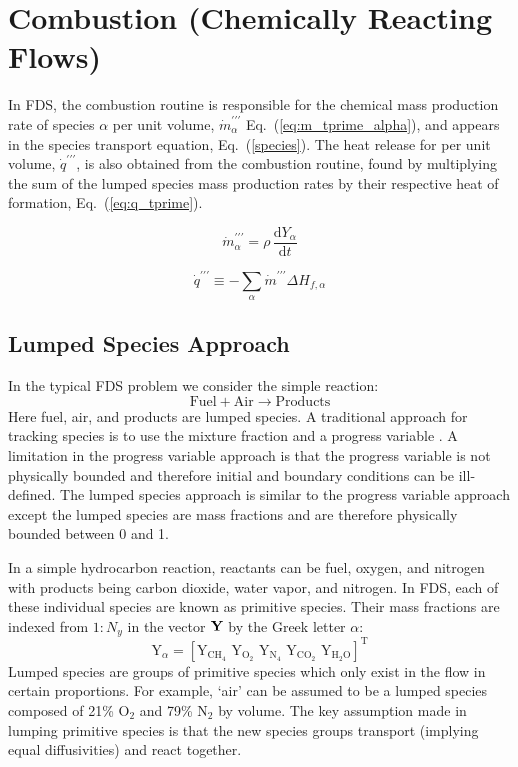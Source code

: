 \chapter{Combustion (Chemically Reacting Flows)}

\label{combustionsection}
In FDS, the combustion routine is responsible for the chemical mass production rate of species $\alpha$ per unit volume, $\dot{m}^{\prime\prime\prime}_{\alpha}$ Eq.~(\ref{eq:m_tprime_alpha}), and appears in the species transport equation, Eq.~(\ref{species}). The heat release for per unit volume, $\dot{q}^{\prime\prime\prime}$, is also obtained from the combustion routine, found by multiplying the sum of the lumped species mass production rates by their respective heat of formation, Eq.~(\ref{eq:q_tprime}).

\begin{equation}\label{eq:m_tprime_alpha}
\dot{m}^{\prime\prime\prime}_{\alpha}=\rho \,\frac{\mbox{d}Y_{\alpha}}{\mbox{d}t}
\end{equation}

\begin{equation}\label{eq:q_tprime}
\dot{q}^{\prime\prime\prime} \equiv -\displaystyle \sum_{\alpha} \dot{m}^{\prime\prime\prime} \Delta H_{f,\alpha}
\end{equation}


\section{Lumped Species Approach}
In the typical FDS problem we consider the simple reaction:
\begin{equation}\label{eq:simple}
\mathrm{Fuel + Air \rightarrow Products}
\end{equation}
Here fuel, air, and products are lumped species. A traditional approach for tracking species is to use the mixture fraction and a progress variable \cite{fox2003}. A limitation in the progress variable approach is that the progress variable is not physically bounded and therefore initial and boundary conditions can be ill-defined. The lumped species approach is similar to the progress variable approach except the lumped species are mass fractions and are therefore physically bounded between 0 and 1.

In a simple hydrocarbon reaction, reactants can be fuel, oxygen, and nitrogen with products being carbon dioxide, water vapor, and nitrogen. In FDS, each of these individual species are known as primitive species. Their mass fractions are indexed from $1:N_{y}$ in the vector ${\bf Y}$ by the Greek letter $\alpha$:
\begin{equation}\label{eq:prim_vector}
\mathrm{Y}_{\alpha} = [\mathrm{Y}_{\mathrm{CH}_4}\, \, \mathrm{Y}_{\mathrm{O}_2}\, \, \mathrm{Y}_{\mathrm{N}_4}\, \, \mathrm{Y}_{\mathrm{CO}_2}\, \, \mathrm{Y}_{\mathrm{H}_2\mathrm{O}}]^\mathrm{T}
\end{equation}
Lumped species are groups of primitive species which only exist in the flow in certain proportions. For example, `air' can be assumed to be a lumped species composed of 21\% O$_2$ and 79\% N$_2$ by volume. The key assumption made in lumping primitive species is that the new species groups transport (implying equal diffusivities) and react together. 

